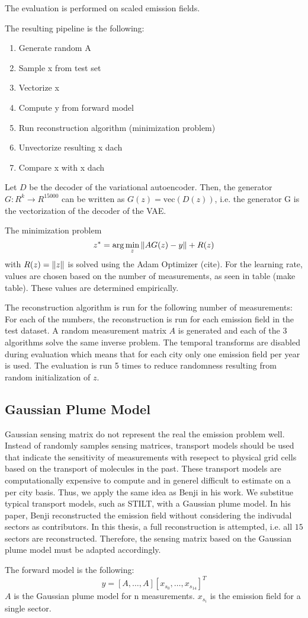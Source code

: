 The evaluation is performed on scaled emission fields.

The resulting pipeline is the following:
\begin{enumerate}
    \item Generate random A
    \item Sample x from test set
    \item Vectorize x
    \item Compute y from forward model
    \item Run reconstruction algorithm (minimization problem)
    \item Unvectorize resulting x dach
    \item Compare x with x dach
\end{enumerate}

Let $D$ be the decoder of the variational autoencoder.
Then, the generator $G: R^k \rightarrow R^{15000}$ can be written as $G(z) = \text{vec}(D(z))$, i.e. the generator G is the vectorization of the decoder of the VAE.

The minimization problem
\begin{equation}
    z^* = \arg\min_{z}{\left\lVert A G(z) - y\right\rVert + R(z)}
\end{equation}
with $R(z) = \left\lVert z\right\rVert$ is solved using the Adam Optimizer (cite).
For the learning rate, values are chosen based on the number of measurements, as seen in table (make table).
These values are determined empirically.

The reconstruction algorithm is run for the following number of measurements:
For each of the numbers, the reconstruction is run for each emission field in the test dataset.
A random measurement matrix $A$ is generated and each of the $3$ algorithms solve the same inverse problem.
The temporal transforms are disabled during evaluation which means that for each city only one emission field per year is used.
The evaluation is run 5 times to reduce randomness resulting from random initialization of $z$.

\subsection{Gaussian Plume Model}
Gaussian sensing matrix do not represent the real the emission problem well.
Instead of randomly samples sensing matrices, transport models should be used that indicate the sensitivity of measurements with resepect to physical grid cells based on the transport of molecules in the past.
These transport models are computationally expensive to compute and in generel difficult to estimate on a per city basis.
Thus, we apply the same idea as Benji in his work.
We substitue typical transport models, such as STILT, with a Gaussian plume model.
In his paper, Benji reconstructed the emission field without considering the indivudal sectors as contributors.
In this thesis, a full reconstruction is attempted, i.e. all $15$ sectors are reconstructed.
Therefore, the sensing matrix based on the Gaussian plume model must be adapted accordingly.

The forward model is the following:
\begin{equation}
    y = [A, \dots, A] [x_{s_0}, \dots, x_{s_{14}}]^T
\end{equation}
$A$ is the Gaussian plume model for n measurements.
$x_{s_i}$ is the emission field for a single sector.
